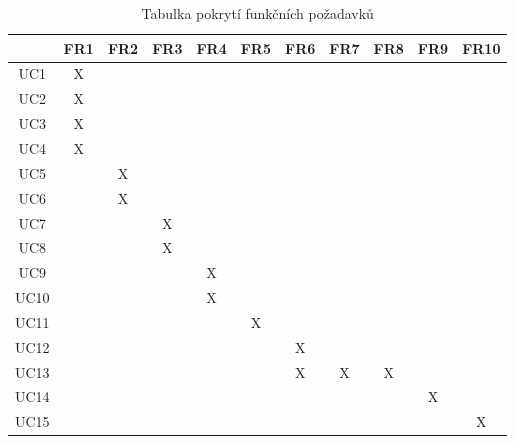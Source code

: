 \documentclass[thesis=M,czech]{FITthesis}[2019/12/23]
\begin{document}
\begin{table}[H]
\begin{tabular}{|c|c|c|c|c|c|c|c|c|c|c|}
\hline
     & FR1 & FR2 & FR3 & FR4 & FR5 & FR6 & FR7 & FR8 & FR9 & FR10 \\ \hline
UC1  & X   &     &     &     &     &     &     &     &     &      \\ \hline
UC2  & X   &     &     &     &     &     &     &     &     &      \\ \hline
UC3  & X   &     &     &     &     &     &     &     &     &      \\ \hline
UC4  & X   &     &     &     &     &     &     &     &     &      \\ \hline
UC5  &     & X   &     &     &     &     &     &     &     &      \\ \hline
UC6  &     & X   &     &     &     &     &     &     &     &      \\ \hline
UC7  &     &     & X   &     &     &     &     &     &     &      \\ \hline
UC8  &     &     & X   &     &     &     &     &     &     &      \\ \hline
UC9  &     &     &     & X   &     &     &     &     &     &      \\ \hline
UC10 &     &     &     & X   &     &     &     &     &     &      \\ \hline
UC11 &     &     &     &     & X   &     &     &     &     &      \\ \hline
UC12 &     &     &     &     &     & X   &     &     &     &      \\ \hline
UC13 &     &     &     &     &     & X   & X   & X   &     &      \\ \hline
UC14 &     &     &     &     &     &     &     &     & X   &      \\ \hline
UC15 &     &     &     &     &     &     &     &     &     & X    \\ \hline
\end{tabular}
\caption{Tabulka pokrytí funkčních požadavků}
\label{tab:fr-coverage}
\end{table}
\end{document}
